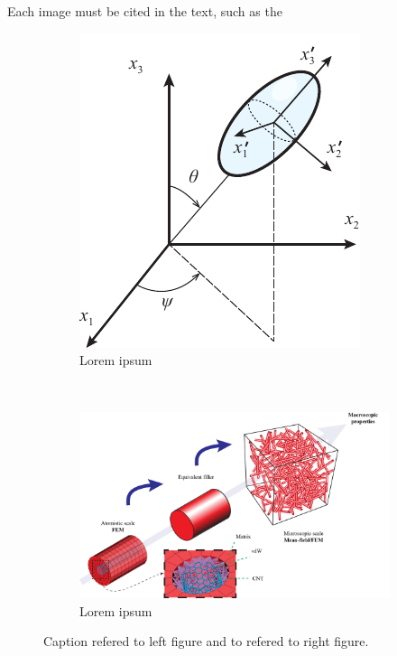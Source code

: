     Each image must be cited in the text, such as the 

        \begin{figure}[htb]
            \centering
            \begin{subfigure}[t]{0.3\textwidth}
                \centering
                \includegraphics[]{figures/eulerang}
                \caption{Lorem ipsum}\label{fig:fig1}
            \end{subfigure}%
            ~
            \begin{subfigure}[t]{0.7\textwidth}
                \centering
                \includegraphics[scale=0.7]{figures/multiscale}
                \caption{Lorem ipsum}\label{fig:fig2}
            \end{subfigure}
            \caption{Caption  refered to left figure and  to refered to right figure.}
            \label{fig:my_label}
        \end{figure}

